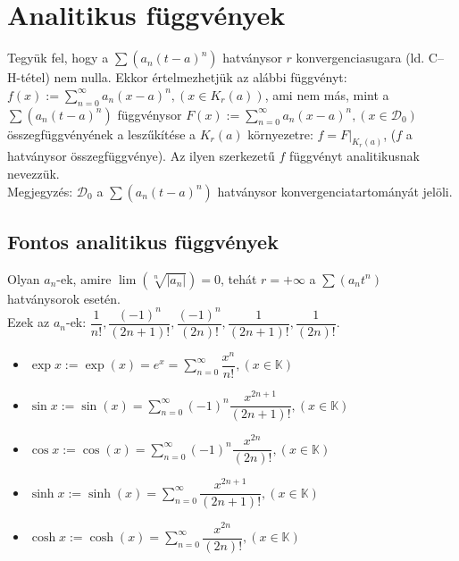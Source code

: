 \documentclass[margin=0px]{article}
\begin{document}
\section{Analitikus függvények}

Tegyük fel, hogy a $\sum{(a_{n}(t-a)^{n})}$ hatványsor $r$ konvergenciasugara (ld. C--H-tétel) nem nulla. Ekkor értelmezhetjük az alábbi függvényt: $f(x) := \sum\limits_{n=0}^{\infty}{a_{n}(x-a)^{n}}, (x \in K_{r}(a))$, ami nem más, mint a $\sum{(a_{n}(t-a)^{n})}$ függvénysor $F(x) := \sum\limits_{n=0}^{\infty}{a_{n}(x-a)^{n}}, (x \in \mathcal{D}_{0})$ összegfüggvényének a leszűkítése a $K_{r}(a)$ környezetre: $f = F|_{K_{r}(a)}$, ($f$ a hatványsor összegfüggvénye). Az ilyen szerkezetű $f$ függvényt analitikusnak nevezzük. \\
Megjegyzés: $\mathcal{D}_{0}$ a $\sum{(a_{n}(t-a)^{n})}$ hatványsor konvergenciatartományát jelöli.

\subsection{Fontos analitikus függvények}

Olyan $a_{n}$-ek, amire $\lim{(\sqrt[n]{|a_{n}|})} = 0$, tehát $r = +\infty$ a $\sum{(a_{n}t^{n})}$ hatványsorok esetén. \vspace{0.3cm} \\
Ezek az $a_{n}$-ek: $\dfrac{1}{n!}, \dfrac{(-1)^n}{(2n+1)!}, \dfrac{(-1)^n}{(2n)!}, \dfrac{1}{(2n+1)!}, \dfrac{1}{(2n)!}$.
\begin{itemize}
    \item $\exp{x} := \exp{(x)} = e^{x} = \sum\limits_{n=0}^{\infty}{\dfrac{x^n}{n!}, (x \in \mathbb{K})}$
    \item $\sin{x} := \sin{(x)} = \sum\limits_{n=0}^{\infty}{(-1)^n\dfrac{x^{2n+1}}{(2n+1)!}, (x \in \mathbb{K})}$
    \item $\cos{x} := \cos{(x)} = \sum\limits_{n=0}^{\infty}{(-1)^n\dfrac{x^{2n}}{(2n)!}, (x \in \mathbb{K})}$
    \item $\sinh{x} := \sinh{(x)} = \sum\limits_{n=0}^{\infty}{\dfrac{x^{2n+1}}{(2n+1)!}, (x \in \mathbb{K})}$
    \item $\cosh{x} := \cosh{(x)} = \sum\limits_{n=0}^{\infty}{\dfrac{x^{2n}}{(2n)!}, (x \in \mathbb{K})}$
\end{itemize}
\end{document}

